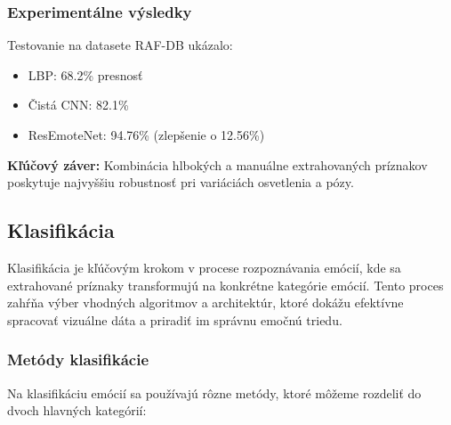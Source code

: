 \subsubsection{Experimentálne výsledky}
Testovanie na datasete RAF-DB ukázalo:
\begin{itemize}
    \item LBP: 68.2\% presnosť
    \item Čistá CNN: 82.1\% 
    \item ResEmoteNet: 94.76\% (zlepšenie o 12.56\%)
\end{itemize}

\textbf{Kľúčový záver:} Kombinácia hlbokých a manuálne extrahovaných príznakov poskytuje najvyššiu robustnosť pri variáciách osvetlenia a pózy.

\subsection{Klasifikácia}

Klasifikácia je kľúčovým krokom v procese rozpoznávania emócií, kde sa extrahované príznaky transformujú na konkrétne kategórie emócií. Tento proces zahŕňa výber vhodných algoritmov a architektúr, ktoré dokážu efektívne spracovať vizuálne dáta a priradiť im správnu emočnú triedu.

\subsubsection{Metódy klasifikácie}
Na klasifikáciu emócií sa používajú rôzne metódy, ktoré môžeme rozdeliť do dvoch hlavných kategórií:

